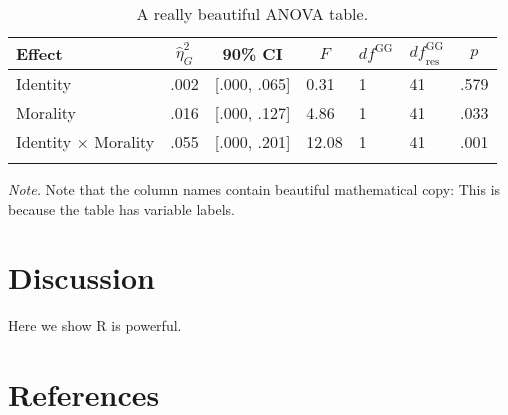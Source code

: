 \documentclass[
  man]{apa6}
\begin{document}
\begin{table}[tbp]

\begin{center}
\begin{threeparttable}

\caption{\label{tab:anovaTable}A really beautiful ANOVA table.}

\begin{tabular}{lllllll}
\toprule
Effect & \multicolumn{1}{c}{$\hat{\eta}^2_G$} & \multicolumn{1}{c}{90\% CI} & \multicolumn{1}{c}{$F$} & \multicolumn{1}{c}{$\mathit{df}^{\mathrm{GG}}$} & \multicolumn{1}{c}{$\mathit{df}_{\mathrm{res}}^{\mathrm{GG}}$} & \multicolumn{1}{c}{$p$}\\
\midrule
Identity & .002 & {}[.000, .065] & 0.31 & 1 & 41 & .579\\
Morality & .016 & {}[.000, .127] & 4.86 & 1 & 41 & .033\\
Identity $\times$ Morality & .055 & {}[.000, .201] & 12.08 & 1 & 41 & .001\\
\bottomrule
\addlinespace
\end{tabular}

\begin{tablenotes}[para]
\normalsize{\textit{Note.} Note that the column names contain beautiful mathematical copy: This is because the table has variable labels.}
\end{tablenotes}

\end{threeparttable}
\end{center}

\end{table}

\section{Discussion}\label{discussion}

Here we show R is powerful.

\newpage

\section{References}\label{references}
\end{document}
